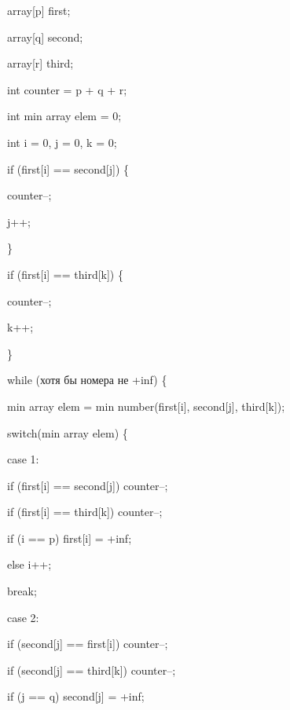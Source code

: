 \documentclass[12pt]{extreport}
\theoremstyle{definiton}
\theoremstyle{definition}
\theoremstyle{definition}
\begin{document}
	array[p] first;
	
	array[q] second;

	array[r] third;

	int counter = p + q + r;

	int min array elem = 0;

	int i = 0, j = 0, k = 0;

	if (first[i] == second[j]) \{
		
		\hspace{4mm} counter--;

		\hspace{4mm} j++;
	
	\}

	if (first[i] == third[k]) \{
		
		\hspace{4mm} counter--;

		\hspace{4mm} k++;
	
	\}

	while (хотя бы номера не +inf) \{

		\hspace{4mm} min array elem = min number(first[i], second[j], third[k]);
		 
		\hspace{4mm} switch(min array elem) \{
			
			\hspace{8mm} case 1:

				\hspace{12mm} if (first[i] == second[j]) counter--;

				\hspace{12mm} if (first[i] == third[k]) counter--;

				\hspace{12mm} if (i == p) first[i] = +inf;

				\hspace{12mm} else i++;

				\hspace{12mm} break;
		
			\hspace{8mm} case 2:
			
				\hspace{12mm} if (second[j] == first[i]) counter--;

				\hspace{12mm} if (second[j] == third[k]) counter--;

				\hspace{12mm} if (j == q) second[j] = +inf;
\end{document}
